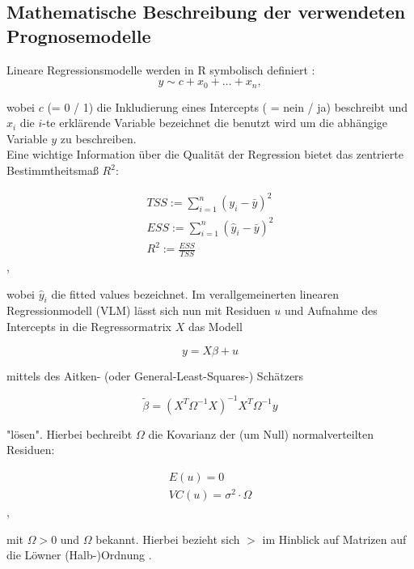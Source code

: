 \documentclass[a4paper,11pt]{article}
\begin{document}
\newpage
\subsection{Mathematische Beschreibung der verwendeten Prognosemodelle}

Lineare Regressionsmodelle werden in R symbolisch definiert \cite{lm}:
\begin{equation}
	y \sim c + x_0 + \dots + x_n,
\end{equation}

wobei $c$ (= 0 / 1) die Inkludierung eines Intercepts ( = nein / ja) beschreibt und $x_i$ die $i$-te erklärende Variable bezeichnet die benutzt wird um die abhängige Variable $y$ zu beschreiben.\\

Eine wichtige Information über die Qualität der Regression bietet das zentrierte Bestimmtheitsmaß $R^2$:

\begin{eqnarray}
	TSS :=  \sum_{i=1}^n(y_i - \bar{y})^2  \\
	ESS :=  \sum_{i=1}^n(\hat{y}_i - \bar{y})^2 \\
	R^2 := \frac{ESS}{TSS}
\end{eqnarray},

wobei $\hat{y}_i$ die fitted values bezeichnet. Im verallgemeinerten linearen Regressionmodell (VLM) lässt sich nun mit Residuen $u$ und Aufnahme des Intercepts in die Regressormatrix $X$ das Modell

\begin{equation}
	y = X\beta +u
\end{equation}

mittels des Aitken- (oder General-Least-Squares-) Schätzers

\begin{equation}
	\tilde{\beta} = (X^T\Omega^{-1}X)^{-1}X^T\Omega^{-1}y	
\end{equation}

"lösen". Hierbei bechreibt $\Omega$ die Kovarianz der (um Null) normalverteilten Residuen:

\begin{eqnarray}
	E(u) = 0\\
	VC(u)=\sigma^2 \cdot \Omega
\end{eqnarray},

mit $\Omega>0$ und $\Omega$ bekannt. Hierbei bezieht sich $>$ im Hinblick auf Matrizen auf die Löwner (Halb-)Ordnung \cite{loew}.\\
\end{document}
